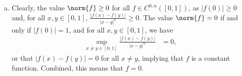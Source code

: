 \documentclass[10pt]{mypackage}
\begin{document}
\begin{enumerate}[(a)]
  \item Clearly, the value $\norm{f} \geq 0$ for all $f\in C^{0,\alpha}\left( [0,1] \right)$, as $\left\vert f(0) \right\vert \geq 0$ and, for all $x,y\in [0,1]$, $\frac{\left\vert f(x)-f(y) \right\vert}{\left\vert x-y \right\vert^{\alpha}}\geq 0$. The value $\norm{f} = 0$ if and only if $\left\vert f(0) \right\vert = 1$, and for all $x,y\in [0,1]$, we have
    \begin{align*}
      \sup_{x\neq y\in [0,1]} \frac{\left\vert f(x)-f(y) \right\vert}{\left\vert x-y \right\vert^{\alpha}} &= 0,
    \end{align*}
    or that $\left\vert f(x)-f(y) \right\vert = 0$ for all $x\neq y$, implying that $f$ is a constant function. Combined, this means that $f = 0$.\newline


\end{enumerate}
\end{document}
